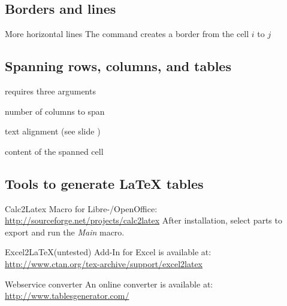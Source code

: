 \subsection{Borders and lines}
\begin{frame}
	\begin{block}{More horizontal lines}
		The  command creates a border from the cell $i$ to $j$
	\end{block}
\end{frame}
\begin{frame}
\end{frame}

\subsection{Spanning rows, columns, and tables}
\begin{frame}
	 requires three arguments
	\begin{menumerate}
		\item number of columns to span
		\item text alignment (see slide \pageref{frm:tabular-column-identifier})
		\item content of the spanned cell
	\end{menumerate}
\end{frame}
\begin{frame}
\end{frame}
\begin{frame}
\end{frame}

\subsection{Tools to generate {\LaTeX} tables}
\begin{frame}
	\begin{block}{Calc2Latex}
		Macro for Libre-/OpenOffice:
		\url{http://sourceforge.net/projects/calc2latex}
		After installation, select parts to export and run the \emph{Main}
		macro.
	\end{block}

	\begin{block}{Excel2LaTeX\hfill{\small (untested)}}
		Add-In for Excel is available at:
		\url{http://www.ctan.org/tex-archive/support/excel2latex}
	\end{block}

	\begin{block}{Webservice converter}
		An online converter is available at:
		\url{http://www.tablesgenerator.com/}
	\end{block}
\end{frame}

